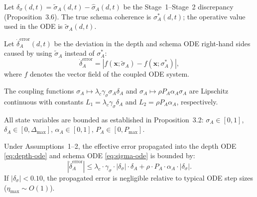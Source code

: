 
\begin{definition}
Let $\delta_\sigma(d,t) = \tilde{\sigma}_A(d,t) - \hat{\sigma}_A(d,t)$
be the Stage~1--Stage~2 discrepancy (Proposition~3.6). The true schema
coherence is $\sigma_A^*(d,t)$; the operative value used in the ODE is
$\tilde{\sigma}_A(d,t)$.
\end{definition}

\begin{definition}
Let $\dot{\delta}_A^{\text{error}}(d,t)$ be the deviation in the depth
and schema ODE right-hand sides caused by using $\tilde{\sigma}_A$
instead of $\sigma_A^*$:
\[
\dot{\delta}_A^{\text{error}} =
|f(\mathbf{x}; \tilde{\sigma}_A) - f(\mathbf{x}; \sigma_A^*)|,
\]
where $f$ denotes the vector field of the coupled ODE system.
\end{definition}

\begin{assumption}
The coupling functions $\sigma_A \mapsto \lambda_c \gamma_\sigma \sigma_A
\delta_A$ and $\sigma_A \mapsto \rho P_A \alpha_A \sigma_A$ are
Lipschitz continuous with constants $L_1 = \lambda_c \gamma_\sigma
\delta_A$ and $L_2 = \rho P_A \alpha_A$, respectively.
\end{assumption}

\begin{assumption}
All state variables are bounded as established in Proposition~3.2:
$\sigma_A \in [0,1]$, $\delta_A \in [0, \Delta_{\max}]$,
$\alpha_A \in [0,1]$, $P_A \in [0, P_{\max}]$.
\end{assumption}

\begin{proposition}
\label{prop:error-prop}
Under Assumptions~1--2, the effective error propagated into the depth
ODE \eqref{eq:depth-ode} and schema ODE \eqref{eq:sigma-ode} is
bounded by:
\[
|\dot{\delta}_A^{\text{error}}| \leq
\lambda_c \cdot \gamma_\sigma \cdot |\delta_\sigma| \cdot \delta_A
+ \rho \cdot P_A \cdot \alpha_A \cdot |\delta_\sigma|.
\]
If $|\delta_\sigma| < 0.10$, the propagated error is negligible
relative to typical ODE step sizes ($\eta_{\max} \sim O(1)$).
\end{proposition}

